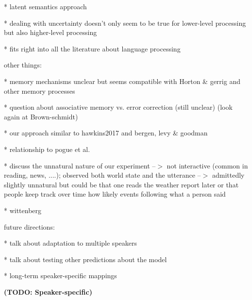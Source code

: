 \documentclass[lucida,biblatex]{sp} %
\newcommand{\todo}[1]{}
\renewcommand{\todo}[1]{{\bf \color{red} (TODO: {#1})}}
\begin{document}
	 * latent semantics approach

 	 * dealing with uncertainty doesn't only seem to be true for lower-level processing but also higher-level processing
	 
	  * fits right into all the literature about language processing
	
	other things:
	
	*  memory mechanisms unclear but seems compatible with Horton \& gerrig and other memory processes
	
	* question about associative memory vs. error correction (still unclear) (look again at Brown-schmidt)
	
 	*  our approach similar to hawkins2017 and bergen, levy \& goodman
	
	*  relationship to pogue et al.
	
	*  discuss the unnatural nature of our experiment --$>$ not interactive (common in reading, news, ....); observed both world state
	     and the utterance --$>$ admittedly slightly unnatural but could be that one reads the weather report later or that people keep track
	     over time how likely events following what a person said
	     
       * wittenberg


future directions:

* talk about adaptation to multiple speakers

* talk about testing other predictions about the model

* long-term speaker-specific mappings
	
\todo{Speaker-specific}


\printbibliography
%



\end{document}
